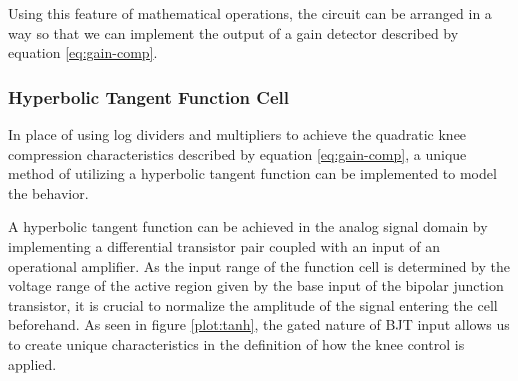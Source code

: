 \documentclass[10pt]{article}
\begin{document}
\begin{multicols*}{2}
\begin{minipage}{\linewidth}
\begin{tikzpicture}[scale = 0.9, transform shape]
                            \end{tikzpicture}

                            \label{fig:pwr-mng}

                        \end{minipage}

                    \vspace{2ex}

                    \noindent Using this feature of mathematical operations, the circuit can be arranged in a way so that we can implement the output of a gain detector described by equation \ref{eq:gain-comp}.

                \subsubsection{Hyperbolic Tangent Function Cell}
                    In place of using log dividers and multipliers to achieve the quadratic knee compression characteristics described by equation \ref{eq:gain-comp}, a unique method of utilizing a hyperbolic tangent function can be implemented to model the behavior.\par
                    A hyperbolic tangent function can be achieved in the analog signal domain by implementing a differential transistor pair coupled with an input of an operational amplifier. As the input range of the function cell is determined by the voltage range of the active region given by the base input of the bipolar junction transistor, it is crucial to normalize the amplitude of the signal entering the cell beforehand. As seen in figure \ref{plot:tanh}, the gated nature of BJT input allows us to create unique characteristics in the definition of how the knee control is applied.

                        \noindent
                        \begin{minipage}{\linewidth}


\end{minipage}
\end{multicols*}
\end{document}
